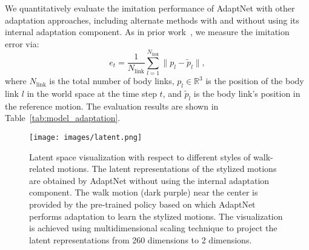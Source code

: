 We quantitatively evaluate the imitation performance of AdaptNet
with other adaptation approaches, including alternate methods 
with and without using its internal adaptation component.  
As in prior work~\cite{harada2004quantitative,tang2008emulating,peng2021amp,iccgan},
we 
measure the imitation error via:
\begin{equation}
    e_t = \frac{1}{N_\text{link}} \sum_{l=1}^{N_\text{link}} \| p_l - \tilde{p}_l\|, 
\end{equation}
where 
$N_\text{link}$ is the total number of body links,
$p_l \in \mathbb{R}^3$ is the position of the body link $l$ in the world space at the time step $t$, and $\tilde{p}_l$ is the body link's position in the reference motion. 
The evaluation results are shown in Table~\ref{tab:model_adaptation}.

\begin{figure*}[t]
    \centering
    \texttt{[image: images/latent.png]}
    \caption{Latent space visualization with respect to different styles of walk-related motions. The latent representations of the stylized motions are obtained by AdaptNet without using the internal adaptation component. The walk motion (dark purple) near the center is provided by the pre-trained policy based on which AdaptNet performs adaptation to learn the stylized motions. The visualization is achieved using multidimensional scaling technique to project the latent representations from 260 dimensions to 2 dimensions. } \vspace{-2pt}
    \label{fig:latent}
\end{figure*} %




